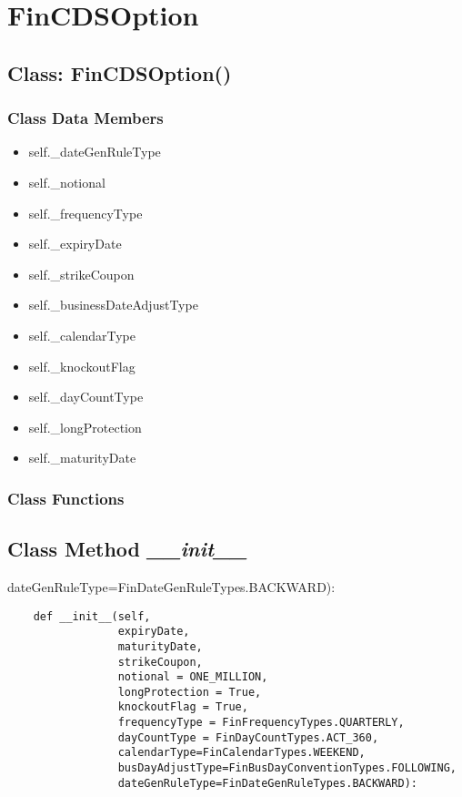 \documentclass[twoside,11pt]{book}
\begin{document}
\newpage
\section{FinCDSOption}

\subsection{Class: FinCDSOption()}


\subsubsection{Class Data Members}
\begin{itemize}
\item{self.\_dateGenRuleType}
\item{self.\_notional}
\item{self.\_frequencyType}
\item{self.\_expiryDate}
\item{self.\_strikeCoupon}
\item{self.\_businessDateAdjustType}
\item{self.\_calendarType}
\item{self.\_knockoutFlag}
\item{self.\_dayCountType}
\item{self.\_longProtection}
\item{self.\_maturityDate}
\end{itemize}

\subsubsection{Class Functions}

\subsection{Class Method {\it \_\_init\_\_}}
dateGenRuleType=FinDateGenRuleTypes.BACKWARD):

\begin{lstlisting}
    def __init__(self, 
                 expiryDate,
                 maturityDate,
                 strikeCoupon,
                 notional = ONE_MILLION,
                 longProtection = True,
                 knockoutFlag = True,
                 frequencyType = FinFrequencyTypes.QUARTERLY,
                 dayCountType = FinDayCountTypes.ACT_360,
                 calendarType=FinCalendarTypes.WEEKEND,
                 busDayAdjustType=FinBusDayConventionTypes.FOLLOWING,
                 dateGenRuleType=FinDateGenRuleTypes.BACKWARD):
\end{lstlisting}
\end{document}
